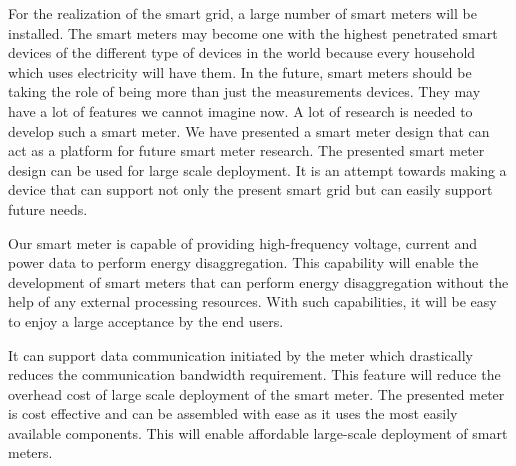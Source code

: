 For the realization of the smart grid, a large number of smart meters will be installed. The smart meters may become one with the highest penetrated smart devices of the different type of devices in the world because every household which uses electricity will have them. In the future, smart meters should be taking the role of being more than just the measurements devices. They may have a lot of features we cannot imagine now. A lot of research is needed to develop such a smart meter. We have presented a smart meter design that can act as a platform for future smart meter research. The presented smart meter design can be used for large scale deployment. It is an attempt towards making a device that can support not only the present smart grid but can easily support future needs.

Our smart meter is capable of providing high-frequency voltage, current and power data to perform energy disaggregation. This capability will enable the development of smart meters that can perform energy disaggregation without the help of any external processing resources. With such capabilities, it will be easy to enjoy a large acceptance by the end users.

It can support data communication initiated by the meter which drastically reduces the communication bandwidth requirement. This feature will reduce the overhead cost of large scale deployment of the smart meter. The presented meter is cost effective and can be assembled with ease as it uses the most easily available components. This will enable affordable large-scale deployment of smart meters.
